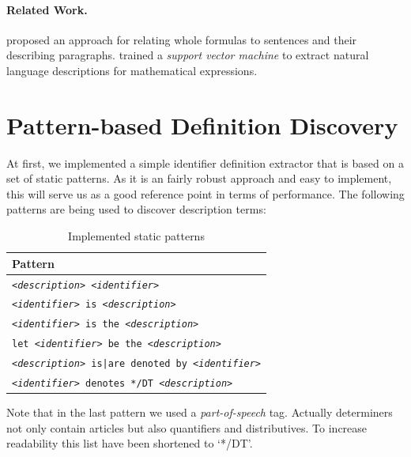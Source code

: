 \documentclass[runningheads]{llncs}
\begin{document}
\paragraph{Related Work.}

\citeauthor{Quoc2010} \cite{Quoc2010} proposed an approach for
relating whole formulas to sentences and their describing paragraphs.
\citeauthor{Yokoi} \cite{Yokoi} trained a \emph{support vector machine} to extract
natural language descriptions for mathematical expressions.

\section{Pattern-based Definition Discovery}

At first, we implemented a simple identifier definition extractor that is
based on a set of static patterns. As it is an fairly robust approach and easy
to implement, this will serve us as a good reference point in terms of
performance. The following patterns are being used to discover description
terms:

\begin{table}
\vspace{-5pt}
	\begin{center}
		\begin{tabular}{| p{9.3cm} |}
			\hline
			Pattern \\
			\hline
			\texttt{\emph{<description>} \emph{<identifier>}} \\
			\texttt{\emph{<identifier>} is \emph{<description>}} \\
			\texttt{\emph{<identifier>} is the \emph{<description>}} \\
			\texttt{let \emph{<identifier>} be the \emph{<description>}} \\
			\texttt{\emph{<description>} is|are denoted by \emph{<identifier>}} \\
			\texttt{\emph{<identifier>} denotes */DT \emph{<description>}} \\
			\hline
		\end{tabular}
	\end{center}
\caption{Implemented static patterns}
\vspace{-5pt}
\end{table}

Note that in the last pattern we used a \emph{part-of-speech} tag. Actually
determiners not only contain articles but also quantifiers and distributives.
To increase readability this list have been shortened to `*/DT'.
\end{document}

